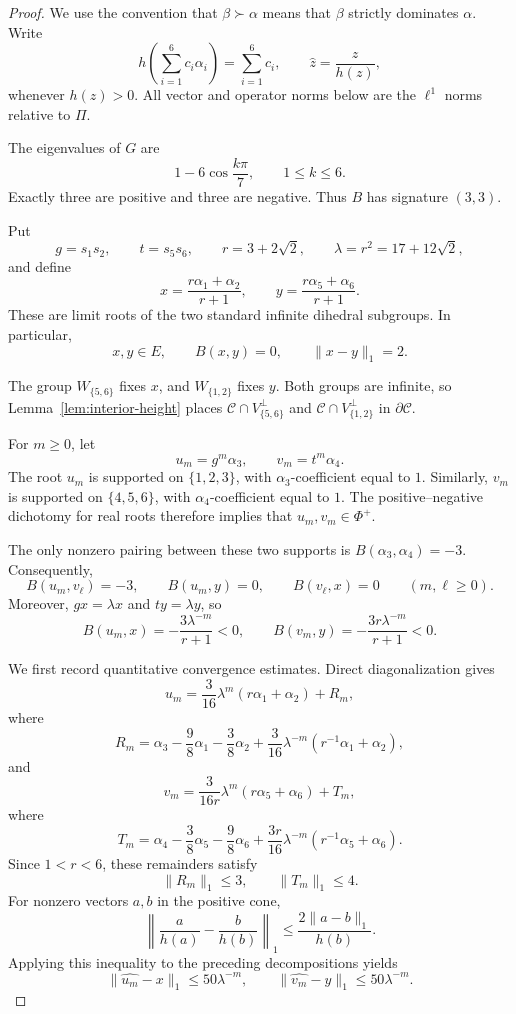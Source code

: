 \documentclass[11pt,reqno]{amsart}
\theoremstyle{plain}
\theoremstyle{definition}
\theoremstyle{remark}
\numberwithin{equation}{section}
\begin{document}
\begin{proof}
We use the convention that $\beta\succ\alpha$ means that $\beta$
strictly dominates $\alpha$. Write
\[
h\left(\sum_{i=1}^6 c_i\alpha_i\right)=\sum_{i=1}^6 c_i,
\qquad
\widehat{z}=\frac{z}{h(z)},
\]
whenever $h(z)>0$. All vector and operator norms below are the
$\ell^1$ norms relative to $\Pi$.

The eigenvalues of $G$ are
\[
1-6\cos\frac{k\pi}{7},
\qquad 1\leq k\leq6.
\]
Exactly three are positive and three are negative. Thus $B$ has
signature $(3,3)$.

Put
\[
g=s_1s_2,\qquad t=s_5s_6,\qquad
r=3+2\sqrt2,\qquad
\lambda=r^2=17+12\sqrt2,
\]
and define
\[
x=\frac{r\alpha_1+\alpha_2}{r+1},
\qquad
y=\frac{r\alpha_5+\alpha_6}{r+1}.
\]
These are limit roots of the two standard infinite dihedral
subgroups. In particular,
\[
x,y\in E,\qquad B(x,y)=0,\qquad \|x-y\|_1=2.
\]

The group $W_{\{5,6\}}$ fixes $x$, and $W_{\{1,2\}}$ fixes $y$.
Both groups are infinite, so Lemma~\ref{lem:interior-height}
places $\mathcal C\cap V_{\{5,6\}}^\perp$ and
$\mathcal C\cap V_{\{1,2\}}^\perp$ in $\partial\mathcal C$.

For $m\geq0$, let
\[
u_m=g^m\alpha_3,\qquad v_m=t^m\alpha_4.
\]
The root $u_m$ is supported on $\{1,2,3\}$, with
$\alpha_3$-coefficient equal to $1$. Similarly, $v_m$ is supported
on $\{4,5,6\}$, with $\alpha_4$-coefficient equal to $1$.
The positive--negative dichotomy for real roots therefore implies
that $u_m,v_m\in\Phi^+$.

The only nonzero pairing between these two supports is
$B(\alpha_3,\alpha_4)=-3$. Consequently,
\[
B(u_m,v_\ell)=-3,\qquad
B(u_m,y)=0,\qquad B(v_\ell,x)=0
\qquad(m,\ell\geq0).
\tag{1}
\]
Moreover, $gx=\lambda x$ and $ty=\lambda y$, so
\[
B(u_m,x)=-\frac{3\lambda^{-m}}{r+1}<0,
\qquad
B(v_m,y)=-\frac{3r\lambda^{-m}}{r+1}<0.
\tag{2}
\]

We first record quantitative convergence estimates. Direct
diagonalization gives
\[
u_m=\frac{3}{16}\lambda^m(r\alpha_1+\alpha_2)+R_m,
\]
where
\[
R_m=
\alpha_3-\frac98\alpha_1-\frac38\alpha_2
+\frac{3}{16}\lambda^{-m}(r^{-1}\alpha_1+\alpha_2),
\]
and
\[
v_m=\frac{3}{16r}\lambda^m(r\alpha_5+\alpha_6)+T_m,
\]
where
\[
T_m=
\alpha_4-\frac38\alpha_5-\frac98\alpha_6
+\frac{3r}{16}\lambda^{-m}(r^{-1}\alpha_5+\alpha_6).
\]
Since $1<r<6$, these remainders satisfy
\[
\|R_m\|_1\leq3,\qquad \|T_m\|_1\leq4.
\]
For nonzero vectors $a,b$ in the positive cone,
\[
\left\|\frac{a}{h(a)}-\frac{b}{h(b)}\right\|_1
\leq\frac{2\|a-b\|_1}{h(b)}.
\]
Applying this inequality to the preceding decompositions yields
\[
\|\widehat{u_m}-x\|_1\leq50\lambda^{-m},
\qquad
\|\widehat{v_m}-y\|_1\leq50\lambda^{-m}.
\tag{3}
\]


\end{proof}
\end{document}
